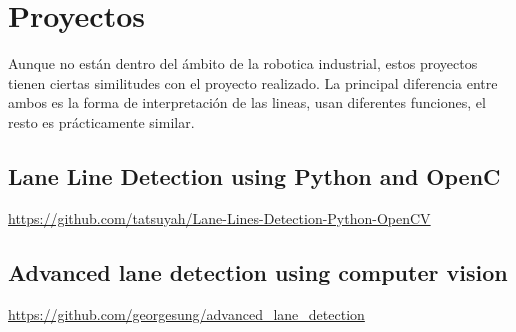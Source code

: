 \section{Proyectos}

Aunque no están dentro del ámbito de la robotica industrial, estos proyectos tienen ciertas similitudes con el proyecto realizado. La principal diferencia entre ambos es la forma de interpretación de las lineas, usan diferentes funciones, el resto es prácticamente similar.

\subsection{Lane Line Detection using Python and OpenC}

\url{https://github.com/tatsuyah/Lane-Lines-Detection-Python-OpenCV}

\subsection{Advanced lane detection using computer vision}
\url{https://github.com/georgesung/advanced_lane_detection}

